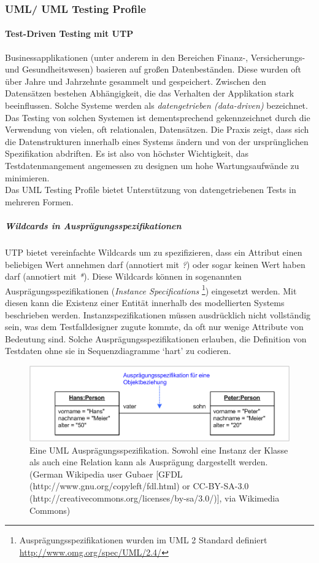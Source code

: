 \subsubsection{UML/ UML Testing Profile}
\paragraph{Test-Driven Testing mit UTP}
Businessapplikationen (unter anderem in den Bereichen Finanz-, Versicherungs- und Gesundheitswesen) basieren auf großen Datenbeständen. Diese wurden oft über Jahre und Jahrzehnte gesammelt und gespeichert. Zwischen den Datensätzen bestehen Abhängigkeit, die das Verhalten der Applikation stark beeinflussen. Solche Systeme werden als \textit{datengetrieben (data-driven)} bezeichnet. Das Testing von solchen Systemen ist dementsprechend gekennzeichnet durch die Verwendung von vielen, oft relationalen, Datensätzen. Die Praxis zeigt, dass sich die Datenstrukturen innerhalb eines Systems ändern und von der ursprünglichen Spezifikation abdriften. Es ist also von höchster Wichtigkeit, das Testdatenmangement angemessen zu designen um hohe Wartungsaufwände zu minimieren.\cite{baker_model-driven_2005}\\
Das UML Testing Profile bietet Unterstützung von datengetriebenen Tests in mehreren Formen.

\subparagraph{Wildcards in Ausprägungsspezifikationen}
UTP bietet vereinfachte Wildcards um zu spezifizieren, dass ein Attribut einen beliebigen Wert annehmen darf (annotiert mit \textit{?}) oder sogar keinen Wert haben darf (annotiert mit \textit{*}). Diese Wildcards können in sogenannten Ausprägungsspezifikationen (\textit{Instance Specifications} \footnote{Ausprägungsspezifikationen wurden im UML 2 Standard definiert \url{http://www.omg.org/spec/UML/2.4/} }) eingesetzt werden. Mit diesen kann die Existenz einer Entität innerhalb des modellierten Systems beschrieben werden. Instanzspezifikationen müssen ausdrücklich nicht vollständig sein, was dem Testfalldesigner zugute kommte, da oft nur wenige Attribute von Bedeutung sind. Solche Ausprägungsspezifikationen erlauben, die Definition von Testdaten ohne sie in Sequenzdiagramme `hart' zu codieren.

\begin{figure}[h] 
  \centering
     \includegraphics[width=1\textwidth]{figures/uml_instance.png}
  \caption{Eine UML Ausprägungsspezifikation. Sowohl eine Instanz der Klasse als auch eine Relation kann als Ausprägung dargestellt werden. (German Wikipedia user Gubaer [GFDL (http://www.gnu.org/copyleft/fdl.html) or CC-BY-SA-3.0 (http://creativecommons.org/licenses/by-sa/3.0/)], via Wikimedia Commons)}
  \label{fig:uml_instance}
\end{figure}